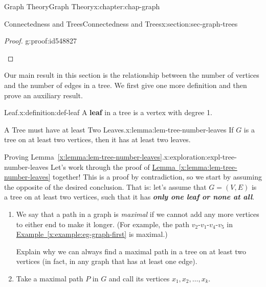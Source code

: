\documentclass[oneside,10pt,]{book}
\newcommand{\xreffont}{\relax}
\newcommand{\alert}[1]{\textbf{\textit{#1}}}
\newcommand{\terminology}[1]{\textbf{#1}}
\numberwithin{equation}{section}
\begin{document}
\begin{chapterptx}{Graph Theory}{}{Graph Theory}{}{}{x:chapter:chap-graph}
\begin{sectionptx}{Connectedness and Trees}{}{Connectedness and Trees}{}{}{x:section:sec-graph-trees}
\begin{proof}{}{g:proof:id548827}
\begin{sidebyside}{2}{0}{0}{0.07}
\begin{sbspanel}{0.18}
{
}%
\end{sbspanel}%
\end{sidebyside}%
\end{proof}
Our main result in this section is the relationship between the number of vertices and the number of edges in a tree. We first give one more definition and then prove an auxiliary result.%
\begin{definition}{Leaf.}{x:definition:def-leaf}%
A \terminology{leaf} in a tree is a vertex with degree 1.%
\end{definition}
\begin{lemma}{A Tree must have at least Two Leaves.}{}{x:lemma:lem-tree-number-leaves}%
If \(G\) is a tree on at least two vertices, then it has at least two leaves.%
\end{lemma}
\begin{exploration}{Proving Lemma~{\xreffont\ref*{x:lemma:lem-tree-number-leaves}}.}{x:exploration:expl-tree-number-leaves}%
Let's work through the proof of \hyperref[x:lemma:lem-tree-number-leaves]{Lemma~{\xreffont\ref{x:lemma:lem-tree-number-leaves}}} together! This is a proof by contradiction, so we start by assuming the opposite of the desired conclusion. That is: let's assume that \(G = (V,E)\) is a tree on at least two vertices, such that it has \alert{only one leaf or none at all}.%
\begin{enumerate}[font=\bfseries,label=(\alph*),ref=\alph*]
\item{}We say that a path in a graph is \emph{maximal} if we cannot add any more vertices to either end to make it longer. (For example, the path \(v_2\)-\(v_1\)-\(v_4\)-\(v_5\) in \hyperref[x:example:eg-graph-first]{Example~{\xreffont\ref{x:example:eg-graph-first}}} is maximal.)%
\par
Explain why we can always find a maximal path in a tree on at least two vertices (in fact, in any graph that has at least one edge).%
\item{}Take a maximal path \(P\) in \(G\) and call its vertices \(x_1,x_2,\ldots,x_k\).%
\begin{sidebyside}{1}{0.3}{0.3}{0}%

\end{sidebyside}
\end{enumerate}
\end{exploration}
\end{sectionptx}
\end{chapterptx}
\end{document}
